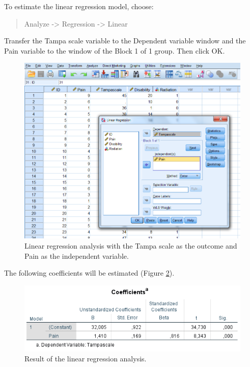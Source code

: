 \documentclass[]{book}
\theoremstyle{definition}
\theoremstyle{definition}
\theoremstyle{definition}
\theoremstyle{remark}
\begin{document}
To estimate the linear regression model, choose:

\begin{quote}
Analyze -\textgreater{} Regression -\textgreater{} Linear
\end{quote}

Transfer the Tampa scale variable to the Dependent variable window and
the Pain variable to the window of the Block 1 of 1 group. Then click
OK.

\begin{figure}

{\centering \includegraphics[width=0.9\linewidth]{images/fig3.14} 

}

\caption{Linear regression analysis with the Tampa scale as the outcome and Pain as the independent variable.}\label{fig:fig3-14}
\end{figure}

The following coefficients will be estimated (Figure \ref{fig:tab3-3}).

\begin{figure}

{\centering \includegraphics[width=0.9\linewidth]{images/table3.3} 

}

\caption{Result of the linear regression analysis.}\label{fig:tab3-3}
\end{figure}
\end{document}
